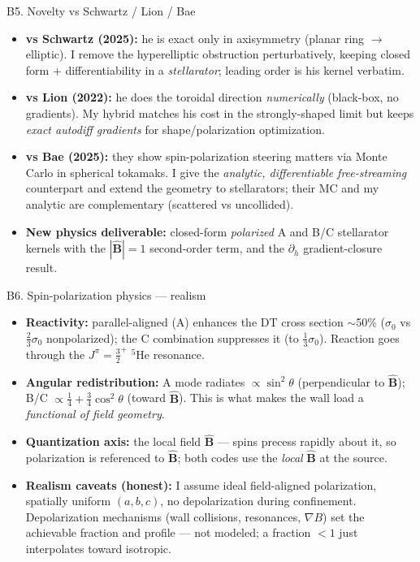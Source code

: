 \documentclass[aspectratio=169]{beamer}
\newcommand{\Bhat}{\hat{\bm{B}}}
\begin{document}
\begin{frame}{B5. Novelty vs Schwartz / Lion / Bae}
  \small
  \begin{itemize}
    \item \textbf{vs Schwartz (2025):} he is exact only in axisymmetry (planar ring $\to$ elliptic).
      I remove the hyperelliptic obstruction perturbatively, keeping closed form + differentiability
      in a \emph{stellarator}; leading order is his kernel verbatim.
    \item \textbf{vs Lion (2022):} he does the toroidal direction \emph{numerically} (black-box, no
      gradients). My hybrid matches his cost in the strongly-shaped limit but keeps \emph{exact
      autodiff gradients} for shape/polarization optimization.
    \item \textbf{vs Bae (2025):} they show spin-polarization steering matters via Monte Carlo in
      spherical tokamaks. I give the \emph{analytic, differentiable free-streaming} counterpart and
      extend the geometry to stellarators; their MC and my analytic are complementary
      (scattered vs uncollided).
    \item \textbf{New physics deliverable:} closed-form \emph{polarized} A and B/C stellarator
      kernels with the $|\Bhat|=1$ second-order term, and the $\partial_h$ gradient-closure result.
  \end{itemize}
\end{frame}

\begin{frame}{B6. Spin-polarization physics --- realism}
  \small
  \begin{itemize}
    \item \textbf{Reactivity:} parallel-aligned (A) enhances the DT cross section $\sim$50\%
      ($\sigma_0$ vs $\tfrac23\sigma_0$ nonpolarized); the C combination suppresses it (to
      $\tfrac13\sigma_0$). Reaction goes through the $J^\pi=\tfrac32^+$ $^5$He resonance.
    \item \textbf{Angular redistribution:} A mode radiates $\propto\sin^2\theta$ (perpendicular to
      $\Bhat$); B/C $\propto\tfrac14+\tfrac34\cos^2\theta$ (toward $\Bhat$). This is what makes the
      wall load a \emph{functional of field geometry}.
    \item \textbf{Quantization axis:} the local field $\Bhat$ --- spins precess rapidly about it,
      so polarization is referenced to $\Bhat$; both codes use the \emph{local} $\Bhat$ at the source.
    \item \textbf{Realism caveats (honest):} I assume ideal field-aligned polarization, spatially
      uniform $(a,b,c)$, no depolarization during confinement. Depolarization mechanisms (wall
      collisions, resonances, $\nabla B$) set the achievable fraction and profile --- not modeled;
      a fraction $<1$ just interpolates toward isotropic.
  \end{itemize}
\end{frame}
\end{document}
